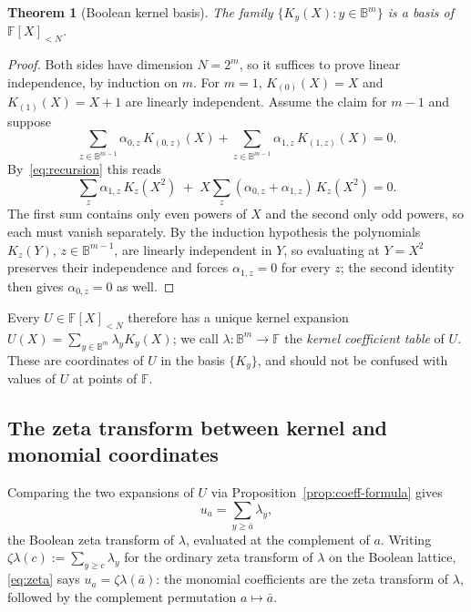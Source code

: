 \documentclass[preprint,3p,12pt,numbers]{elsarticle}
\newtheorem{theorem}{Theorem}[section]
\theoremstyle{definition}
\theoremstyle{remark}
\begin{document}
\begin{theorem}[Boolean kernel basis]
\label{thm:basis}
The family $\{K_y(X) : y \in \mathbb{B}^m\}$ is a basis of
$\mathbb{F}[X]_{<N}$.
\end{theorem}

\begin{proof}
Both sides have dimension $N=2^m$, so it suffices to prove linear
independence, by induction on $m$. For $m=1$, $K_{(0)}(X)=X$ and
$K_{(1)}(X)=X+1$ are linearly independent. Assume the claim for $m-1$ and
suppose
\[
  \sum_{z \in \mathbb{B}^{m-1}} \alpha_{0,z}\, K_{(0,z)}(X)
  + \sum_{z \in \mathbb{B}^{m-1}} \alpha_{1,z}\, K_{(1,z)}(X) = 0 .
\]
By~\eqref{eq:recursion} this reads
\[
  \sum_z \alpha_{1,z}\, K_z(X^2)
  \;+\; X \sum_z (\alpha_{0,z}+\alpha_{1,z})\, K_z(X^2) = 0 .
\]
The first sum contains only even powers of $X$ and the second only odd
powers, so each must vanish separately. By the induction hypothesis the
polynomials $K_z(Y)$, $z \in \mathbb{B}^{m-1}$, are linearly independent in
$Y$, so evaluating at $Y=X^2$ preserves their independence and forces
$\alpha_{1,z}=0$ for every $z$; the second identity then gives
$\alpha_{0,z}=0$ as well.
\end{proof}

Every $U \in \mathbb{F}[X]_{<N}$ therefore has a unique kernel expansion
$U(X) = \sum_{y \in \mathbb{B}^m} \lambda_y K_y(X)$; we call
$\lambda : \mathbb{B}^m \to \mathbb{F}$ the \emph{kernel coefficient table}
of $U$. These are coordinates of $U$ in the basis $\{K_y\}$, and should not
be confused with values of $U$ at points of $\mathbb{F}$.

\subsection{The zeta transform between kernel and monomial coordinates}
\label{subsec:zeta}

Comparing the two expansions of $U$ via Proposition~\ref{prop:coeff-formula}
gives
\begin{equation}
\label{eq:zeta}
  u_a = \sum_{y \geq \bar a} \lambda_y ,
\end{equation}
the Boolean zeta transform of $\lambda$, evaluated at the complement of
$a$. Writing $\zeta\lambda(c) := \sum_{y \geq c} \lambda_y$ for the
ordinary zeta transform of $\lambda$ on the Boolean lattice,
\eqref{eq:zeta} says $u_a = \zeta\lambda(\bar a)$: the monomial
coefficients are the zeta transform of $\lambda$, followed by the
complement permutation $a \mapsto \bar a$.
\end{document}
